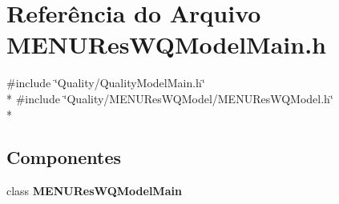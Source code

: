 \section{Referência do Arquivo M\+E\+N\+U\+Res\+W\+Q\+Model\+Main.\+h}
\label{_m_e_n_u_res_w_q_model_main_8h}
{\ttfamily \#include \char`\"{}Quality/\+Quality\+Model\+Main.\+h\char`\"{}}\\*
{\ttfamily \#include \char`\"{}Quality/\+M\+E\+N\+U\+Res\+W\+Q\+Model/\+M\+E\+N\+U\+Res\+W\+Q\+Model.\+h\char`\"{}}\\*
\subsection*{Componentes}
\begin{DoxyCompactItemize}
\item 
class {\bf M\+E\+N\+U\+Res\+W\+Q\+Model\+Main}
\end{DoxyCompactItemize}
